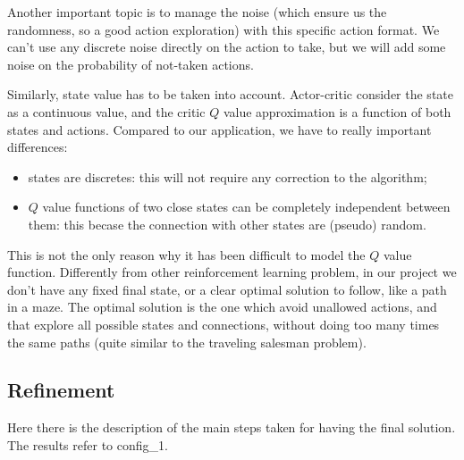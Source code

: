 \documentclass{article}
\begin{document}
Another important topic is to manage the noise (which ensure us the randomness, so a good action exploration) with this specific action format. We can't use any discrete noise directly on the action to take, but we will add some noise on the probability of not-taken actions.

Similarly, state value has to be taken into account. Actor-critic consider the state as a continuous value, and the critic $Q$ value approximation is a function of both states and actions. Compared to our application, we have to really important differences:
\begin{itemize}
\item states are discretes: this will not require any correction to the algorithm;
\item $Q$ value functions of two close states can be completely independent between them: this becase the connection with other states are (pseudo) random.
\end{itemize}

This is not the only reason why it has been difficult to model the $Q$ value function. Differently from other reinforcement learning problem, in our project we don't have any fixed final state, or a clear optimal solution to follow, like a path in a maze. The optimal solution is the one which avoid unallowed actions, and that explore all possible states and connections, without doing too many times the same paths (quite similar to the traveling salesman problem). 

\subsection{Refinement}
% 
% 
% 

Here there is the description of the main steps taken for having the final solution. The results refer to config\_1.
\end{document}
